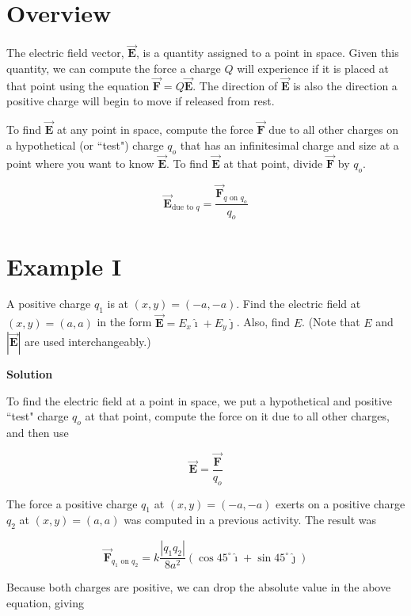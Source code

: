 \documentclass{article}
\newcommand{\ihat}[0]{\hat{\boldsymbol{\imath}}}
\newcommand{\jhat}[0]{\hat{\boldsymbol{\jmath}}}
\newcommand{\bfvec}[1]{\vec{\mathbf{#1}}}
\begin{document}

\section{Overview}

The electric field vector, $\bfvec{E}$, is a quantity assigned to a point in space. Given this quantity, we can compute the force a charge $Q$ will experience if it is placed at that point using the equation $\bfvec{F}=Q\bfvec{E}$. The direction of $\bfvec{E}$ is also the direction a positive charge will begin to move if released from rest.

To find $\bfvec{E}$ at any point in space, 
compute the force $\bfvec{F}$ due to all other charges on a hypothetical (or ``test") charge $q_o$ that has an infinitesimal charge and size at a point where you want to know $\bfvec{E}$. To find $\bfvec{E}$ at that point, divide $\bfvec{F}$ by $q_o$.

$$\bfvec{E}_{\text{due to }q} = \frac{\bfvec{F}_{q\text{ on }q_o}}{q_o}$$


\section{Example I}

A positive charge $q_1$ is at $(x,y)=(-a,-a)$. Find the electric field at $(x,y)=(a,a)$ in the form $\bfvec{E}=E_x\ihat + E_y\jhat$. Also, find $E$. (Note that $E$ and $|\bfvec{E}|$ are used interchangeably.)

\textbf{Solution}

To find the electric field at a point in space, we put a hypothetical and positive ``test" charge $q_o$ at that point, compute the force on it due to all other charges, and then use

$$\bfvec{E} = \frac{\bfvec{F}}{q_o}$$

The force a positive charge $q_1$ at $(x,y)=(-a,-a)$ exerts on a positive charge $q_2$ at $(x,y)=(a, a)$ was computed in a previous activity. The result was

$$\bfvec{F}_{q_1\text{ on } q_2}=k\frac{|q_1q_2|}{8a^2}(\cos 45^\circ \ihat + \sin 45^\circ \jhat)$$

Because both charges are positive, we can drop the absolute value in the above equation, giving
\end{document}
